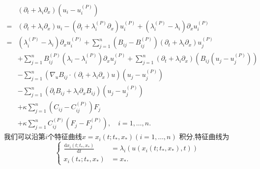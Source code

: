 \documentclass[notitlepage,cs4size,punct,oneside]{ctexrep}
\numberwithin{equation}{chapter}
\theoremstyle{mystyle}
\begin{document}
\begin{align}
      & \left(\partial_{t}+\lambda_{i} \partial_{x}\right)\left(u_{i}-u_{i}^{(P)}\right)\nonumber                                                                                                                                    \\
    = & \left(\partial_{t}+\lambda_{i} \partial_{x}\right) u_{i}-\left(\partial_{t}+\lambda_{i}^{(P)} \partial_{x}\right) u_{i}^{(P)}+\left(\lambda_{i}^{(P)}-\lambda_{i}\right) \partial_{x} u_{i}^{(P)}\nonumber                   \\
    = & \left(\lambda_{i}^{(P)}-\lambda_{i}\right) \partial_{x} u_{i}^{(P)}+\sum_{j=1}^{n}\left(B_{i j}-B_{i j}^{(P)}\right)\left(\partial_{t}+\lambda_{i} \partial_{x}\right) u_{j}^{(P)}\nonumber                                  \\
      & +\sum_{j=1}^{n} B_{i j}^{(P)}\left(\lambda_{i}-\lambda_{i}^{(P)}\right) \partial_{x} u_{j}^{(P)}+\sum_{j=1}^{n}\left(\partial_{t}+\lambda_{i} \partial_{x}\right)\left(B_{i j}\left(u_{j}-u_{j}^{(P)}\right)\right)\nonumber \\
      & -\sum_{j=1}^{n}\left(\nabla_{u} B_{i j} \cdot\left(\partial_{t}+\lambda_{i} \partial_{x}\right) u\right)\left(u_{j}-u_{j}^{(P)}\right)\nonumber                                                                              \\
      & - \sum_{j=1}^{n} \left(\partial_{t}B_{i j}+\lambda_{i} \partial_{x}B_{i j}\right)\left(u_{j}-u_{j}^{(P)}\right)\nonumber                                                                                                     \\
      & + \kappa \sum_{j=1}^{n}\left(C_{i j}-C_{i j}^{(P)}\right)F_j\nonumber                                                                                                                                                        \\
      & + \kappa \sum_{j=1}^{n}C_{i j}^{(P)}\left(F_j-F_j^{(P)}\right), \quad i=1, \ldots, n .\label{C15}
\end{align}
我们可以沿第$i$个特征曲线$x=x_{i}\left(t ; t_{*}, x_{*}\right)(i=1, \ldots, n)$ 积分,特征曲线为
\begin{equation}\label{C16}
    \left\{\begin{aligned}
        \frac{\mathrm{d} x_{i}\left(t ; t_{*}, x_{*}\right)}{\mathrm{d} t} & =\lambda_{i}\left(u\left(x_{i}\left(t ; t_{*}, x_{*}\right), t\right)\right) \\
        x_{i}\left(t_{*} ; t_{*}, x_{*}\right)                             & =x_{*} .
    \end{aligned}\right.
\end{equation}
\end{document}
